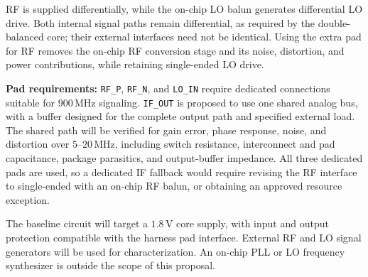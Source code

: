 RF is supplied differentially, while the on-chip LO balun generates differential LO drive.
Both internal signal paths remain differential, as required by the double-balanced core; their external interfaces need not be identical.
Using the extra pad for RF removes the on-chip RF conversion stage and its noise, distortion, and power contributions, while retaining single-ended LO drive.

\textbf{Pad requirements:}
\texttt{RF\_P}, \texttt{RF\_N}, and \texttt{LO\_IN} require dedicated connections suitable for \(900\,\mathrm{MHz}\) signaling.
\texttt{IF\_OUT} is proposed to use one shared analog bus, with a buffer designed for the complete output path and specified external load.
The shared path will be verified for gain error, phase response, noise, and distortion over \(5\)--\(20\,\mathrm{MHz}\), including switch resistance, interconnect and pad capacitance, package parasitics, and output-buffer impedance.
All three dedicated pads are used, so a dedicated IF fallback would require revising the RF interface to single-ended with an on-chip RF balun, or obtaining an approved resource exception.

The baseline circuit will target a \(1.8\,\mathrm{V}\) core supply, with input and output protection compatible with the harness pad interface.
External RF and LO signal generators will be used for characterization.
An on-chip PLL or LO frequency synthesizer is outside the scope of this proposal.
